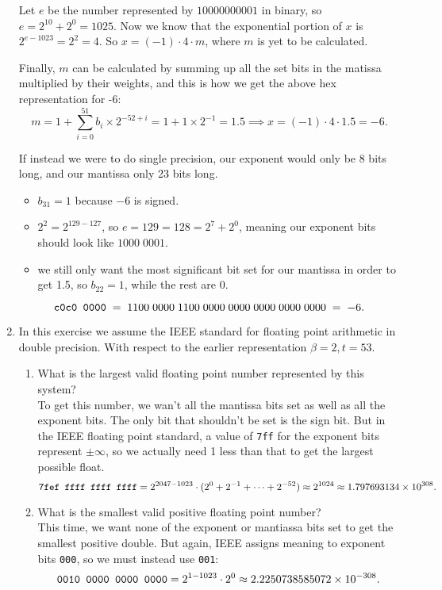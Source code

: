 \documentclass[11pt]{article}
\newcommand{\n}{\vspace{0.3cm}}
\begin{document}
\begin{enumerate}
	      Let \(e\) be the number represented by \(10000000001\) in binary, so \(e = 2^{10} + 2^0 = 1025\).  Now we know that the exponential portion of \(x\) is \(2^{e-1023} = 2^2 = 4\).  So \(x = (-1) \cdot 4 \cdot m\), where \(m\) is yet to be calculated. \n

	      Finally, \(m\) can be calculated by summing up all the set bits in the matissa multiplied by their weights, and this is how we get the above hex representation for -6:
	      \[m = 1 + \sum_{i=0}^{51} b_i \times 2^{-52+i} = 1 + 1 \times 2^{-1} = 1.5 \implies x = (-1) \cdot 4 \cdot 1.5 = -6.\]

	      If instead we were to do single precision, our exponent would only be 8 bits long, and our mantissa only 23 bits long.
	      \begin{itemize}
		      \item \(b_{31} = 1\) because \(-6\) is signed.
		      \item \(2^2 = 2^{129-127}\), so \(e = 129 = 128 = 2^7 + 2^0\), meaning our exponent bits should look like \(1000\;0001\).
		      \item we still only want the most significant bit set for our mantissa in order to get 1.5, so \(b_{22} = 1\), while the rest are 0.
	      \end{itemize}
	      \[\verb!c0c0 0000! \;=\; 1100\;0000\;1100\;0000\;0000\;0000\;0000\;0000 \;=\; -6.\]

	\item In this exercise we assume the IEEE standard for floating point arithmetic in double precision.  With respect to the earlier representation \(\beta = 2, t = 53\).
	      \begin{enumerate}
		      \item What is the largest valid floating point number represented by this system? \n\\
		            To get this number, we wan't all the mantissa bits set as well as all the exponent bits.  The only bit that shouldn't be set is the sign bit.  But in the IEEE floating point standard, a value of \verb!7ff! for the exponent bits represent \(\pm \infty\), so we actually need 1 less than that to get the largest possible float.
		            \[\verb!7fef ffff ffff ffff! = 2^{2047-1023} \cdot (2^0 + 2^{-1} + \dots + 2^{-52}) \approx 2^{1024} \approx 1.797693134 \times 10^{308}.\]

		      \item What is the smallest valid positive floating point number? \n\\
		            This time, we want none of the exponent or mantiassa bits set to get the smallest positive double.  But again, IEEE assigns meaning to exponent bits \verb!000!, so we must instead use \verb!001!:
		            \[\verb!0010 0000 0000 0000! = 2^{1-1023} \cdot 2^0 \approx 2.2250738585072 \times 10^{-308}.\]


\end{enumerate}
\end{enumerate}
\end{document}
